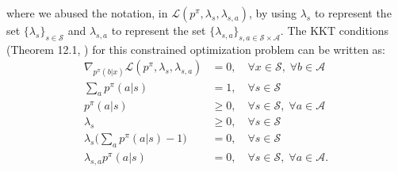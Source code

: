 \documentclass[a4paper, 10pt]{article}
\begin{document}
where we abused the notation, in $\mathcal{L}(p^\pi, \lambda_s, \lambda_{s, a})$, by using $\lambda_s$ to represent the set $\{\lambda_s\}_{s \in \mathcal{S}}$ and $\lambda_{s, a}$ to represent the set $\{\lambda_{s, a}\}_{s, a \in \mathcal{S} \times \mathcal{A}}$. The KKT conditions (Theorem 12.1, \citet{nocedal2006numerical}) for this constrained optimization problem can be written as:
\begin{align}
  \nabla_{p^\pi(b|x)} \mathcal{L}(p^\pi, \lambda_s, \lambda_{s, a}) &= 0, \quad \forall x \in \mathcal{S}, \; \forall b \in \mathcal{A} \tag{C1} \label{eq: KKT1} \\
  \sum_a p^\pi(a | s) &= 1, \quad \forall s \in \mathcal{S} \tag{C2} \label{eq: KKT2} \\
  p^\pi(a | s) &\geq 0, \quad \forall s \in \mathcal{S}, \; \forall a \in \mathcal{A} \tag{C3} \label{eq: KKT3} \\
  \lambda_s &\geq 0, \quad \forall s \in \mathcal{S} \tag{C4} \label{eq: KKT4} \\
  \lambda_{s} \bigg( \sum_a p^\pi(a | s) - 1 \bigg) &= 0, \quad \forall s \in \mathcal{S} \tag{C5} \label{eq: KKT5} \\
  \lambda_{s, a} p^\pi(a | s) &= 0, \quad \forall s \in \mathcal{S}, \; \forall a \in \mathcal{A}. \tag{C6} \label{eq: KKT6}
\end{align}
\end{document}
